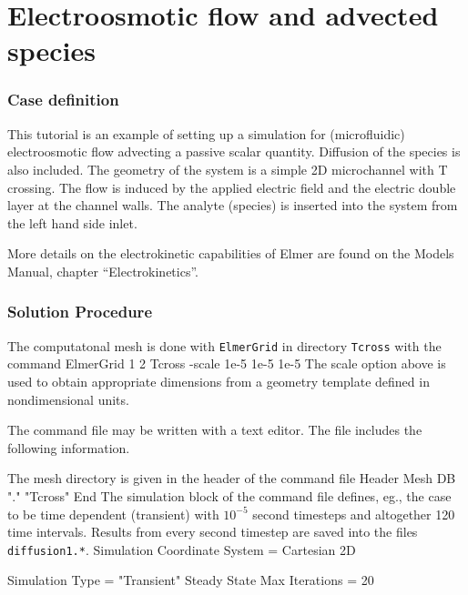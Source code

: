 \chapter{Electroosmotic flow and advected species}



\subsection*{Case definition}

This tutorial is an example of setting up a simulation for
(microfluidic) electroosmotic flow advecting a passive scalar
quantity. Diffusion of the species is also included. The geometry of
the system is a simple 2D microchannel with T crossing. The flow is
induced by the applied electric field and the electric double layer at
the channel walls. The analyte (species) is inserted into the system
from the left hand side inlet.

More details on the electrokinetic capabilities of Elmer are found on
the Models Manual, chapter ``Electrokinetics''.


\subsection*{Solution Procedure}

The computatonal mesh is done with \texttt{ElmerGrid} in directory
\texttt{Tcross} with the command 
%
\ttbegin
ElmerGrid 1 2 Tcross -scale 1e-5 1e-5 1e-5
\ttend
%
The scale option above is used to obtain appropriate dimensions from a
geometry template defined in nondimensional units.

The command file may be written with a text editor. The file includes
the following information. 

The mesh directory is given in the header of the command file
%
\ttbegin
Header
  Mesh DB "." "Tcross"
End
\ttend
%
The simulation block of the command file defines, eg., the case to be time
dependent (transient) with $10^{-5}$ second timesteps and altogether
120 time intervals. Results from every second timestep are saved into
the files \texttt{diffusion1.*}.
%
\ttbegin
Simulation
  Coordinate System = Cartesian 2D

  Simulation Type = "Transient"
  Steady State Max Iterations = 20

